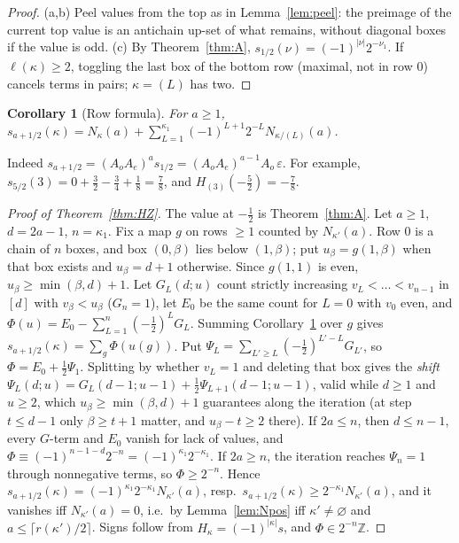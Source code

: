 \documentclass[submission]{FPSAC2027}
\newtheorem{corollary}[theorem]{Corollary}
\theoremstyle{definition}
\theoremstyle{remark}
\newcommand{\Z}{\mathbb{Z}}
\begin{document}
\begin{proof}
(a,b) Peel values from the top as in Lemma~\ref{lem:peel}: the preimage of the current top value
is an antichain up-set of what remains, without diagonal boxes if the value is odd. (c) By
Theorem~\ref{thm:A}, $s_{1/2}(\nu)=(-1)^{|\nu|}2^{-\nu_1}$. If $\ell(\kappa)\ge2$, toggling the last
box of the bottom row (maximal, not in row $0$) cancels terms in pairs; $\kappa=(L)$ has two.
\end{proof}

\begin{corollary}[Row formula]\label{cor:row}
For $a\ge1$, $s_{a+1/2}(\kappa)=N_\kappa(a)+\sum_{L=1}^{\kappa_1}(-1)^{L+1}2^{-L}N_{\kappa/(L)}(a)$.
\end{corollary}

Indeed $s_{a+1/2}=(A_oA_e)^as_{1/2}=(A_oA_e)^{a-1}A_o\,\varepsilon$. For example,
$s_{5/2}(3)=0+\tfrac32-\tfrac34+\tfrac18=\tfrac78$, and $H_{(3)}(-\tfrac52)=-\tfrac78$.

\begin{proof}[Proof of Theorem~\ref{thm:HZ}]
The value at $-\tfrac12$ is Theorem~\ref{thm:A}. Let $a\ge1$, $d=2a-1$, $n=\kappa_1$. Fix a map $g$
on rows $\ge1$ counted by $N_{\kappa'}(a)$. Row $0$ is a chain of $n$ boxes, and box $(0,\beta)$ lies
below $(1,\beta)$; put $u_\beta=g(1,\beta)$ when that box exists and $u_\beta=d+1$ otherwise. Since
$g(1,1)$ is even, $u_\beta\ge\min(\beta,d)+1$. Let $G_L(d;u)$ count strictly increasing
$v_L<\dots<v_{n-1}$ in $[d]$ with $v_\beta<u_\beta$ ($G_n=1$), let $E_0$ be the same count for
$L=0$ with $v_0$ even, and $\Phi(u)=E_0-\sum_{L=1}^n(-\tfrac12)^LG_L$. Summing
Corollary~\ref{cor:row} over $g$ gives $s_{a+1/2}(\kappa)=\sum_g\Phi(u(g))$. Put
$\Psi_L=\sum_{L'\ge L}(-\tfrac12)^{L'-L}G_{L'}$, so $\Phi=E_0+\tfrac12\Psi_1$. Splitting by
whether $v_L=1$ and deleting that box gives the \emph{shift}
$\Psi_L(d;u)=G_L(d-1;u-1)+\tfrac12\Psi_{L+1}(d-1;u-1)$, valid while $d\ge1$ and $u\ge2$, which
$u_\beta\ge\min(\beta,d)+1$ guarantees along the iteration (at step $t\le d-1$ only $\beta\ge t+1$ matter, and $u_\beta-t\ge2$ there). If $2a\le n$, then $d\le n-1$, every $G$-term
and $E_0$ vanish for lack of values, and $\Phi\equiv(-1)^{n-1-d}2^{-n}=(-1)^{\kappa_1}2^{-\kappa_1}$.
If $2a\ge n$, the iteration reaches $\Psi_n=1$ through nonnegative terms, so $\Phi\ge2^{-n}$. Hence
$s_{a+1/2}(\kappa)=(-1)^{\kappa_1}2^{-\kappa_1}N_{\kappa'}(a)$, resp.\
$s_{a+1/2}(\kappa)\ge2^{-\kappa_1}N_{\kappa'}(a)$, and it vanishes iff $N_{\kappa'}(a)=0$, i.e.\ by
Lemma~\ref{lem:Npos} iff $\kappa'\ne\varnothing$ and $a\le\lceil r(\kappa')/2\rceil$. Signs follow
from $H_\kappa=(-1)^{|\kappa|}s$, and $\Phi\in2^{-n}\Z$.
\end{proof}
\end{document}
